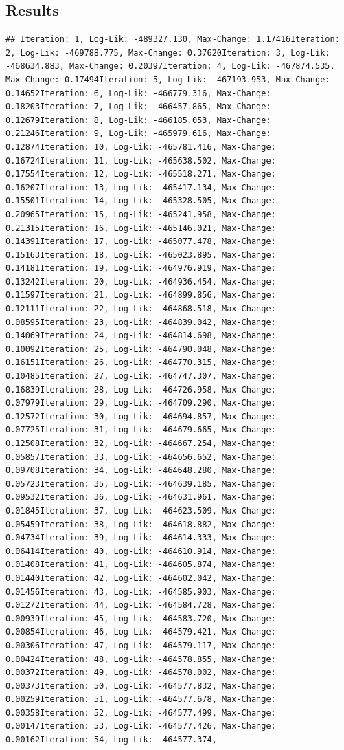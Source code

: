 \documentclass[
  jou]{apa6}
\begin{document}
\hypertarget{results-1}{%
\subsection{Results}\label{results-1}}

\begin{verbatim}
## Iteration: 1, Log-Lik: -489327.130, Max-Change: 1.17416Iteration: 2, Log-Lik: -469788.775, Max-Change: 0.37620Iteration: 3, Log-Lik: -468634.883, Max-Change: 0.20397Iteration: 4, Log-Lik: -467874.535, Max-Change: 0.17494Iteration: 5, Log-Lik: -467193.953, Max-Change: 0.14652Iteration: 6, Log-Lik: -466779.316, Max-Change: 0.18203Iteration: 7, Log-Lik: -466457.865, Max-Change: 0.12679Iteration: 8, Log-Lik: -466185.053, Max-Change: 0.21246Iteration: 9, Log-Lik: -465979.616, Max-Change: 0.12874Iteration: 10, Log-Lik: -465781.416, Max-Change: 0.16724Iteration: 11, Log-Lik: -465638.502, Max-Change: 0.17554Iteration: 12, Log-Lik: -465518.271, Max-Change: 0.16207Iteration: 13, Log-Lik: -465417.134, Max-Change: 0.15501Iteration: 14, Log-Lik: -465328.505, Max-Change: 0.20965Iteration: 15, Log-Lik: -465241.958, Max-Change: 0.21315Iteration: 16, Log-Lik: -465146.021, Max-Change: 0.14391Iteration: 17, Log-Lik: -465077.478, Max-Change: 0.15163Iteration: 18, Log-Lik: -465023.895, Max-Change: 0.14181Iteration: 19, Log-Lik: -464976.919, Max-Change: 0.13242Iteration: 20, Log-Lik: -464936.454, Max-Change: 0.11597Iteration: 21, Log-Lik: -464899.856, Max-Change: 0.12111Iteration: 22, Log-Lik: -464868.518, Max-Change: 0.08595Iteration: 23, Log-Lik: -464839.042, Max-Change: 0.14069Iteration: 24, Log-Lik: -464814.698, Max-Change: 0.10092Iteration: 25, Log-Lik: -464790.048, Max-Change: 0.16151Iteration: 26, Log-Lik: -464770.315, Max-Change: 0.10485Iteration: 27, Log-Lik: -464747.307, Max-Change: 0.16839Iteration: 28, Log-Lik: -464726.958, Max-Change: 0.07979Iteration: 29, Log-Lik: -464709.290, Max-Change: 0.12572Iteration: 30, Log-Lik: -464694.857, Max-Change: 0.07725Iteration: 31, Log-Lik: -464679.665, Max-Change: 0.12508Iteration: 32, Log-Lik: -464667.254, Max-Change: 0.05857Iteration: 33, Log-Lik: -464656.652, Max-Change: 0.09708Iteration: 34, Log-Lik: -464648.280, Max-Change: 0.05723Iteration: 35, Log-Lik: -464639.185, Max-Change: 0.09532Iteration: 36, Log-Lik: -464631.961, Max-Change: 0.01845Iteration: 37, Log-Lik: -464623.509, Max-Change: 0.05459Iteration: 38, Log-Lik: -464618.882, Max-Change: 0.04734Iteration: 39, Log-Lik: -464614.333, Max-Change: 0.06414Iteration: 40, Log-Lik: -464610.914, Max-Change: 0.01408Iteration: 41, Log-Lik: -464605.874, Max-Change: 0.01440Iteration: 42, Log-Lik: -464602.042, Max-Change: 0.01456Iteration: 43, Log-Lik: -464585.903, Max-Change: 0.01272Iteration: 44, Log-Lik: -464584.728, Max-Change: 0.00939Iteration: 45, Log-Lik: -464583.720, Max-Change: 0.00854Iteration: 46, Log-Lik: -464579.421, Max-Change: 0.00306Iteration: 47, Log-Lik: -464579.117, Max-Change: 0.00424Iteration: 48, Log-Lik: -464578.855, Max-Change: 0.00372Iteration: 49, Log-Lik: -464578.002, Max-Change: 0.00373Iteration: 50, Log-Lik: -464577.832, Max-Change: 0.00259Iteration: 51, Log-Lik: -464577.678, Max-Change: 0.00358Iteration: 52, Log-Lik: -464577.499, Max-Change: 0.00147Iteration: 53, Log-Lik: -464577.426, Max-Change: 0.00162Iteration: 54, Log-Lik: -464577.374, 
\end{verbatim}
\end{document}
